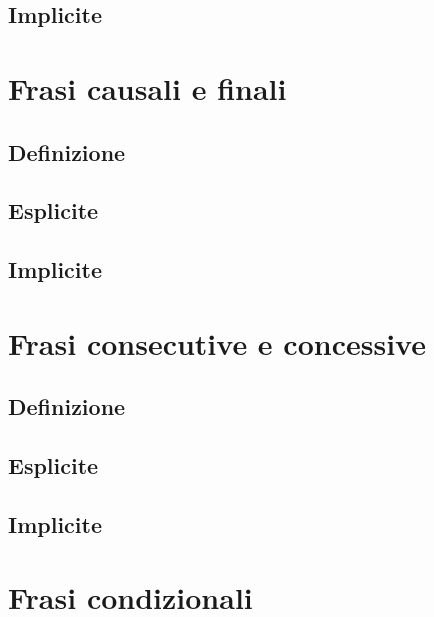 \documentclass[a4paper,twoside,11pt,chapterprefix=false,bibliography=totocnumbered,listof=flat]{scrbook}
\begin{document}
\hypertarget{implicite-3}{%
\section{Implicite}\label{implicite-3}}

\hypertarget{frasi-causali-e-finali}{%
\chapter{Frasi causali e finali}\label{frasi-causali-e-finali}}

\hypertarget{definizione-2}{%
\section{Definizione}\label{definizione-2}}

\hypertarget{esplicite-4}{%
\section{Esplicite}\label{esplicite-4}}

\hypertarget{implicite-4}{%
\section{Implicite}\label{implicite-4}}

\hypertarget{frasi-consecutive-e-concessive}{%
\chapter{Frasi consecutive e concessive}\label{frasi-consecutive-e-concessive}}

\hypertarget{definizione-3}{%
\section{Definizione}\label{definizione-3}}

\hypertarget{esplicite-5}{%
\section{Esplicite}\label{esplicite-5}}

\hypertarget{implicite-5}{%
\section{Implicite}\label{implicite-5}}

\hypertarget{frasi-condizionali}{%
\chapter{Frasi condizionali}\label{frasi-condizionali}}
\end{document}
